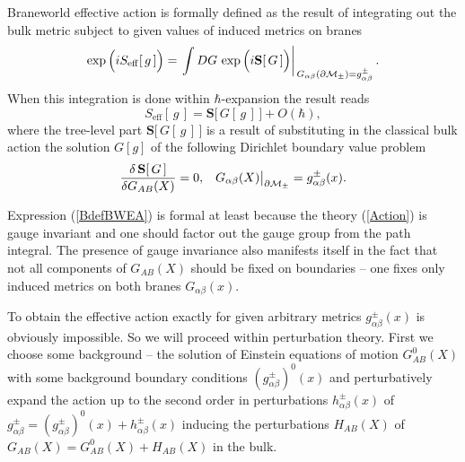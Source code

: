 \documentclass[a4paper,12pt]{article}
\newcommand{\za}{{\alpha}}   %
\newcommand{\zb}{{\beta}}    %
\newcommand{\ZA}{{A}}    %
\newcommand{\ZB}{{B}}    %
\newcommand{\dM}{{\partial \cal M}}
\begin{document}
Braneworld effective action is formally defined
\cite{BWEA,Duality} as the result of integrating out the bulk
metric subject to given values of induced metrics on branes
    \begin{equation}
    \exp\Big(iS_{\mathrm{eff}}[\,g\,]\Big)
    =\left.\int D G\,
    \exp\Big(i\mathbf{S}[\,G\,]\Big)
    \right|_{\,G_{\za\zb}(\dM_\pm)
      =g^\pm_{\za\zb}}.                 \label{BdefBWEA}
    \end{equation}
\fi When this
integration is done within $\hbar$-expansion the result reads
    \begin{equation}
     S_{\mathrm{eff}}[\,g\,]
     =\mathbf{S}\big[\,G[\,g\,]\,\big]
     +O(\hbar),  \label{DefBWEALoopExp}
    \end{equation}
where the tree-level part
$\mathbf{S}\big[\,G[\,g\,]\,\big]$ is a result of substituting in
the classical bulk action the solution $G[g]$ of the following
Dirichlet boundary value problem
    \begin{equation}
    \displaystyle{\frac{\delta\,\mathbf{S}[\,G\,]}
    {\delta G_{AB}(X)}}=0,\;\;\;
    G_{\za\zb}(X)\big|_{\dM_\pm}=g^\pm_{\za\zb}(x).
    \label{F(f)}
    \end{equation}

Expression (\ref{BdefBWEA}) is formal at least because the theory
(\ref{Action}) is gauge invariant and one should factor out the
gauge group from the path integral. The presence of gauge
invariance also manifests itself in the fact that not all
components of $G_{\ZA\ZB}(X)$ should be fixed on boundaries -- one
fixes only induced metrics on both branes  $G_{\za\zb}(x)$.

To obtain the effective action exactly for given arbitrary metrics
$g^\pm_{\za\zb}(x)$ is obviously impossible. So we will proceed
within perturbation theory. First we choose some background -- the
solution of Einstein equations of motion $ G^0_{\ZA\ZB}(X)$ with
some background boundary conditions $(g^{\pm}_{\za\zb})^0(x)$ and
perturbatively expand the action up to the second order in
perturbations $h_{\za\zb}^\pm(x)$ of
$g^{\pm}_{\za\zb}=(g^{\pm}_{\za\zb})^0(x) +h_{\za\zb}^\pm(x)$
inducing the perturbations $H_{AB}(X)$ of
$G_{\ZA\ZB}(X)=G^0_{\ZA\ZB}(X)+H_{\ZA\ZB}(X)$ in the bulk.
\end{document}
